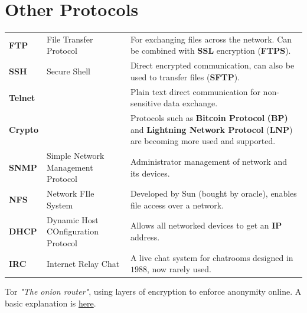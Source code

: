 \section{Other Protocols}
\begin{tabular}{l l p{}}
    \textbf{FTP}    & File Transfer Protocol              & For exchanging files across the network. Can be combined with \textbf{SSL} encryption (\textbf{FTPS}).                                                 \\
    \textbf{SSH}    & Secure Shell                        & Direct encrypted communication, can also be used to transfer files (\textbf{SFTP}).                                                                    \\
    \textbf{Telnet} &                                     & Plain text direct communication for non-sensitive data exchange.                                                                                       \\
    \textbf{Crypto} &                                     & Protocols such as \textbf{Bitcoin Protocol} \textbf{(BP)} and \textbf{Lightning Network Protocol} (\textbf{LNP}) are becoming more used and supported. \\
    \textbf{SNMP}   & Simple Network Management Protocol  & Administrator management of network and its devices.                                                                                                   \\
    \textbf{NFS}    & Network FIle System                 & Developed by Sun (bought by oracle), enables file access over a network.                                                                               \\
    \textbf{DHCP}   & Dynamic Host COnfiguration Protocol & Allows all networked devices to get an \textbf{IP} address.                                                                                            \\
    \textbf{IRC}    & Internet Relay Chat                 & A live chat system for chatrooms designed in $1988$, now rarely used.                                                                                  \\
\end{tabular}

\begin{sidenotebox}{Tor}
    \textit{"The onion router"}, using layers of encryption to enforce anonymity online. A basic explanation is \href{https://www.youtube.com/watch?v=QRYzre4bf7I}{here}.
\end{sidenotebox}
